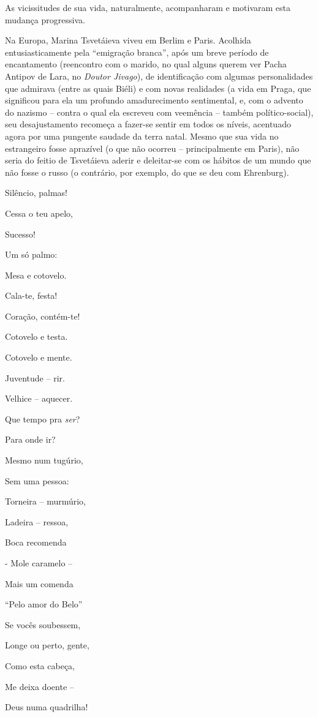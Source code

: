 As vicissitudes de sua vida, naturalmente, acompanharam e motivaram esta
mudança progressiva.

Na Europa, Marina Tsvetáieva viveu em Berlim e Paris. Acolhida
entusiasticamente pela ``emigração branca'', após um breve período de
encantamento (reencontro com o marido, no qual alguns querem ver Pacha
Antipov de Lara, no \emph{Doutor Jivago}), de identificação com algumas
personalidades que admirava (entre as quais Biéli) e com novas
realidades (a vida em Praga, que significou para ela um profundo
amadurecimento sentimental, e, com o advento do nazismo -- contra o qual
ela escreveu com veemência -- também político-social), seu
desajustamento recomeça a fazer-se sentir em todos os níveis, acentuado
agora por uma pungente saudade da terra natal. Mesmo que sua vida no
estrangeiro fosse aprazível (o que não ocorreu -- principalmente em
Paris), não seria do feitio de Tsvetáieva aderir e deleitar-se com os
hábitos de um mundo que não fosse o russo (o contrário, por exemplo, do
que se deu com Ehrenburg).

Silêncio, palmas!

Cessa o teu apelo,

Sucesso!

Um só palmo:

Mesa e cotovelo.

Cala-te, festa!

Coração, contém-te!

Cotovelo e testa.

Cotovelo e mente.

Juventude -- rir.

Velhice -- aquecer.

Que tempo pra \emph{ser}?

Para onde ir?

Mesmo num tugúrio,

Sem uma pessoa:

Torneira -- murmúrio,

Ladeira -- ressoa,

Boca recomenda

- Mole caramelo --

Mais um comenda

``Pelo amor do Belo''

Se vocês soubessem,

Longe ou perto, gente,

Como esta cabeça,

Me deixa doente --

Deus numa quadrilha!

